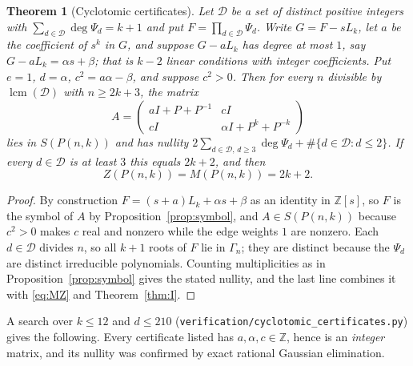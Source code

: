 \documentclass[11pt]{article}
\newtheorem{theorem}{Theorem}
\theoremstyle{definition}
\begin{document}
\begin{theorem}[Cyclotomic certificates]\label{thm:cyclo}
Let $\mathcal D$ be a set of distinct positive integers with
$\sum_{d\in \mathcal D}\deg\Psi_d=k+1$ and put $F=\prod_{d\in \mathcal D}\Psi_d$. Write
$G=F-sL_k$, let $a$ be the coefficient of $s^{k}$ in $G$, and suppose
$G-aL_k$ has degree at most $1$, say $G-aL_k=\alpha s+\beta$; that is
$k-2$ linear conditions with integer coefficients. Put $e=1$, $d=\alpha$,
$c^{2}=a\alpha-\beta$, and suppose $c^{2}>0$. Then for every $n$ divisible by
$\operatorname{lcm}(\mathcal D)$ with $n\ge2k+3$, the matrix
\[
  A=\begin{pmatrix} aI+P+P^{-1} & cI\\ cI & \alpha I+P^{k}+P^{-k}\end{pmatrix}
\]
lies in $S(P(n,k))$ and has nullity
$2\sum_{d\in \mathcal D,\,d\ge3}\deg\Psi_d+\#\{d\in \mathcal D: d\le2\}$. If every $d\in \mathcal D$ is
at least $3$ this equals $2k+2$, and then
\[
  Z(P(n,k))=M(P(n,k))=2k+2 .
\]
\end{theorem}

\begin{proof}
By construction $F=(s+a)L_k+\alpha s+\beta$ as an identity in
$\mathbb Z[s]$, so $F$ is the symbol of $A$ by
Proposition~\ref{prop:symbol}, and $A\in S(P(n,k))$ because $c^{2}>0$ makes
$c$ real and nonzero while the edge weights $1$ are nonzero. Each $d\in \mathcal D$
divides $n$, so all $k+1$ roots of $F$ lie in $\Gamma_n$; they are distinct
because the $\Psi_d$ are distinct irreducible polynomials. Counting
multiplicities as in Proposition~\ref{prop:symbol} gives the stated nullity,
and the last line combines it with \eqref{eq:MZ} and Theorem~\ref{thm:I}.
\end{proof}

A search over $k\le12$ and $d\le210$
(\texttt{verification/cyclotomic\_certificates.py}) gives the following. Every
certificate listed has $a,\alpha,c\in\mathbb Z$, hence is an \emph{integer}
matrix, and its nullity was confirmed by exact rational Gaussian elimination.
\end{document}
